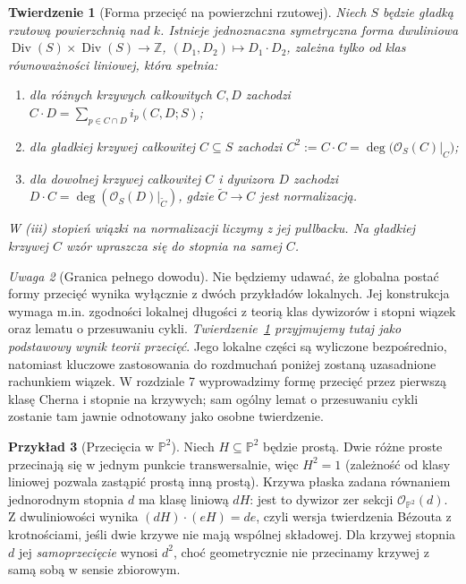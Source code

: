 \documentclass[11pt,a4paper,openany]{report}
\numberwithin{equation}{section}
\theoremstyle{plain}
\newtheorem{twierdzenie}{Twierdzenie}[section]
\theoremstyle{definition}
\newtheorem{przyklad}[twierdzenie]{Przykład}
\theoremstyle{remark}
\newtheorem{uwaga}[twierdzenie]{Uwaga}
\newcommand{\Z}{\mathbb Z}
\newcommand{\PP}{\mathbb P}
\begin{document}
\begin{twierdzenie}[Forma przecięć na powierzchni rzutowej]
\label{tw:ga6-intersection-global}
Niech $S$ będzie gładką rzutową powierzchnią nad $k$.
Istnieje jednoznaczna symetryczna forma dwuliniowa
$\operatorname{Div}(S)\times\operatorname{Div}(S)\to\Z$,
$(D_1,D_2)\mapsto D_1\cdot D_2$, zależna tylko od klas
równoważności liniowej, która spełnia:
\begin{enumerate}[label=(\roman*)]
\item dla różnych krzywych całkowitych $C,D$ zachodzi
$C\cdot D=\sum_{p\in C\cap D}i_p(C,D;S)$;
\item dla gładkiej krzywej całkowitej $C\subseteq S$
zachodzi $C^2:=C\cdot C=\deg\bigl(\mathcal O_S(C)|_C\bigr)$;
\item dla dowolnej krzywej całkowitej $C$ i dywizora $D$
zachodzi $D\cdot C=\deg(\mathcal O_S(D)|_{\widetilde C})$,
gdzie $\widetilde C\to C$ jest normalizacją.
\end{enumerate}
W (iii) stopień wiązki na normalizacji liczymy z jej
pullbacku. Na gładkiej krzywej $C$ wzór upraszcza się
do stopnia na samej $C$.
\end{twierdzenie}

\begin{uwaga}[Granica pełnego dowodu]
Nie będziemy udawać, że globalna postać formy przecięć
wynika wyłącznie z dwóch przykładów lokalnych. Jej konstrukcja
wymaga m.in. zgodności lokalnej długości z teorią klas dywizorów
i stopni wiązek oraz lematu o przesuwaniu cykli.
\emph{Twierdzenie~\ref{tw:ga6-intersection-global} przyjmujemy tutaj
jako podstawowy wynik teorii przecięć}. Jego lokalne części
są wyliczone bezpośrednio, natomiast kluczowe zastosowania
do rozdmuchań poniżej zostaną uzasadnione rachunkiem wiązek.
W rozdziale 7 wyprowadzimy formę przecięć przez
pierwszą klasę Cherna i stopnie na krzywych;
sam ogólny lemat o przesuwaniu cykli zostanie tam jawnie
odnotowany jako osobne twierdzenie.
\end{uwaga}

\begin{przyklad}[Przecięcia w $\PP^2$]
\label{prz:ga6-p2}
Niech $H\subseteq\PP^2$ będzie prostą. Dwie różne proste
przecinają się w jednym punkcie transwersalnie,
więc $H^2=1$ (zależność od klasy liniowej pozwala zastąpić
prostą inną prostą). Krzywa płaska zadana równaniem jednorodnym
stopnia $d$ ma klasę liniową $dH$: jest to dywizor zer
sekcji $\mathcal O_{\PP^2}(d)$. Z dwuliniowości wynika
$(dH)\cdot(eH)=de$, czyli wersja twierdzenia Bézouta
z krotnościami, jeśli dwie krzywe nie mają wspólnej składowej.
Dla krzywej stopnia $d$ jej \emph{samoprzecięcie} wynosi $d^2$,
choć geometrycznie nie przecinamy krzywej z samą sobą
w sensie zbiorowym.
\end{przyklad}
\end{document}
